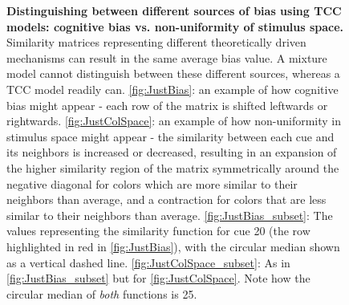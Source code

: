 \begin{figure}
    \begin{subfigure}[b]{0.45\textwidth}
         \centering
         \caption{}
         
    \end{subfigure}
    \hfill
    \begin{subfigure}[b]{0.45\textwidth}
         \centering
         \caption{}
         \llap{\raisebox{3cm}{}} 
    \end{subfigure}
        \caption{\textbf{Distinguishing between different sources of bias using TCC models: cognitive bias vs. non-uniformity of stimulus space.} Similarity matrices representing different theoretically driven mechanisms can result in the same average bias value. A mixture model cannot distinguish between these different sources, whereas a TCC model readily can. \ref{fig:JustBias}: an example of how cognitive bias might appear - each row of the matrix is shifted leftwards or rightwards. \ref{fig:JustColSpace}: an example of how non-uniformity in stimulus space might appear - the similarity between each cue and its neighbors is increased or decreased, resulting in an expansion of the higher similarity region of the matrix symmetrically around the negative diagonal for colors which are more similar to their neighbors than average, and a contraction for colors that are less similar to their neighbors than average. \ref{fig:JustBias_subset}: The values representing the similarity function for cue 20 (the row highlighted in red in \ref{fig:JustBias}), with the circular median shown as a vertical dashed line. \ref{fig:JustColSpace_subset}: As in \ref{fig:JustBias_subset} but for \ref{fig:JustColSpace}. Note how the circular median of \emph{both} functions is 25.}
        \label{fig:TCCDemo}
\end{figure}

